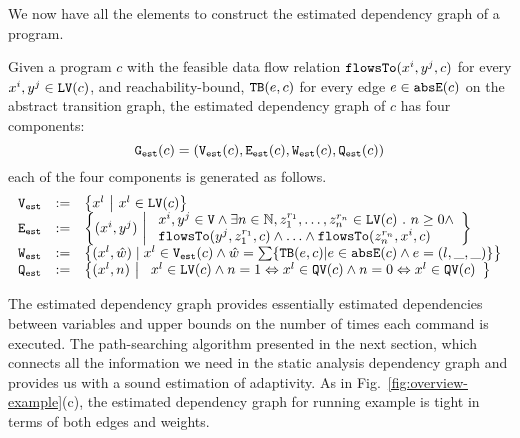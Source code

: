 We now have all the elements to construct the estimated dependency graph of a program.
\begin{defn}
\label{def:prog_graph}
Given a program $c$ 
with the feasible data flow relation $\mathtt{flowsTo}(x^i, y^j, c)$ for every $x^i, y^j \in \mathtt{LV}(c)$, 
and reachability-bound, ${\mathtt{TB}}(e, c)$ for every edge $e \in \mathtt{abs}{\mathtt{E}}(c)$ on the abstract transition graph,
the estimated dependency graph of $c$ has four components:
\[\mathtt{{G_{est}}}(c) = (\mathtt{{V_{est}}}(c), \mathtt{{E_{est}}}(c), \mathtt{{W_{est}}}(c), \mathtt{{Q_{est}}}(c))\]
each of the four components is generated as follows.
{\small
\[
\begin{array}{lll}
\progV & := & \left\{ 
x^l
~ \middle\vert ~
x^l \in \lvar(c)
\right\}
\\
\progE & := & 
\left\{ 
(x^i, y^j) 
~ \middle\vert ~
\begin{array}{l}
x^i, y^j \in \vertxs
\land
\exists n \in \mathbb{N}, z_1^{r_1}, \ldots, z_n^{r_n} \in \lvar(c) \st
n \geq 0 \land
\\
\flowsto(y^j, z_1^{r_1}, c) 
\land \ldots \land \flowsto(z_n^{r_n}, x^i, c) 
\end{array}
\right\}
\\
\progW & := &
\left\{ (x^l, \hat{w}) 
\mid
x^l \in \progV(c) 
\land 
\hat{w} = 
\sum\left\{ \absclr(e, c) \middle\vert e \in \absE(c) \land e = (l, \_, \_) \right\}
\right\}
\\
\progF & := & 
\left\{(x^l, n) 
~ \middle\vert ~
\begin{array}{l}
 x^l \in \lvar(c) \land
 n = 1 \Leftrightarrow x^l \in \qvar(c)
\land n = 0 \Leftrightarrow x^l \in \qvar(c)
\end{array}
\right\}
\end{array}
\] }
\end{defn}
The estimated dependency graph provides essentially estimated dependencies between variables and upper bounds on the number of times each  command is executed. The  path-searching algorithm presented in the next section, which connects all the information we need in the static analysis dependency graph and provides us with a sound estimation of adaptivity.
As in Fig.~\ref{fig:overview-example}(c), the estimated dependency graph for
running example is tight in terms of both edges and weights.
